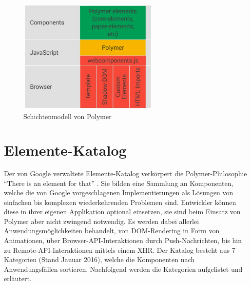 \begin{figure}[h]
 \centering
 \includegraphics[width=7cm,keepaspectratio]{kapitel3/bilder/1-architektur}
 \caption{Schichtenmodell von Polymer}
 \label{fig:schimopo}
\end{figure}


\section{Elemente-Katalog}\label{elemente-katalog}

Der von Google verwaltete Elemente-Katalog verkörpert die Polymer-Philosophie ``There is an element for that'' \cite{citeulike:13930590}. Sie bilden eine Sammlung an Komponenten, welche die von Google vorgeschlagenen Implementierungen als Lösungen von einfachen bis komplexen wiederkehrenden Problemen sind. Entwickler können diese in ihrer eigenen Applikation optional einsetzen, sie sind beim Einsatz von Polymer aber nicht zwingend notwendig. Es werden dabei allerlei Anwendungsmöglichkeiten behandelt, von \ac{DOM}-Rendering in Form von Animationen, über Browser-\ac{API}-Interaktionen durch Push-Nachrichten, bis hin zu Remote-\ac{API}-Interaktionen mittels einem \ac{XHR}. Der Katalog besteht aus 7 Kategorien (Stand Januar 2016), welche die Komponenten nach Anwendungsfällen sortieren. Nachfolgend werden die Kategorien aufgelistet und erläutert.



